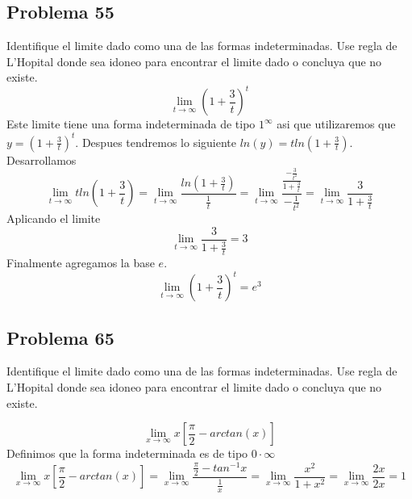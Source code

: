\documentclass{article}
\begin{document}
\subsection{Problema 55}
Identifique el limite dado como una de las formas indeterminadas. Use regla de L'Hopital donde sea idoneo para encontrar el limite dado o concluya que no existe.
\setcounter{equation}{0}
\begin{equation}
    \lim_{t\to \infty}\left(1+\frac{3}{t}\right)^t
\end{equation}
Este limite tiene una forma indeterminada de tipo $1^\infty$ asi que utilizaremos que $y=\left(1+\frac{3}{t}\right)^t$. Despues tendremos lo siguiente $ln(y) =tln\left(1+\frac{3}{t}\right) $.
\newline
Desarrollamos
\begin{equation}
    \lim_{t\to \infty}tln\left(1+\frac{3}{t}\right) = \lim_{t\to \infty}\frac{ln\left(1+\frac{3}{t}\right)}{\frac{1}{t}}=\lim_{t\to \infty}\frac{\frac{-\frac{3}{t^2}}{1+\frac{3}{t}}}{-\frac{1}{t^2}} = \lim_{t\to \infty} \frac{3}{1+\frac{3}{t}}
\end{equation}
Aplicando el limite
\begin{equation}
    \lim_{t\to \infty} \frac{3}{1+\frac{3}{t}} = 3
\end{equation}
Finalmente agregamos la base $e$.
\begin{equation}
    \lim_{t\to \infty}\left(1+\frac{3}{t}\right)^t = e^3
\end{equation}

\subsection{Problema 65}
Identifique el limite dado como una de las formas indeterminadas. Use regla de L'Hopital donde sea idoneo para encontrar el limite dado o concluya que no existe.
\setcounter{equation}{0}

\begin{equation}
    \lim_{x\to \infty} x\left[\frac{\pi}{2}-arctan(x)\right]
\end{equation}
Definimos que la forma indeterminada es de tipo $0\cdot \infty$
\begin{equation}
    \lim_{x\to \infty} x\left[\frac{\pi}{2}-arctan(x)\right] = \lim_{x\to \infty}\frac{\frac{\pi}{2}-tan^{-1}x}{\frac{1}{x}} = \lim_{x\to \infty}\frac{x^2}{1+x^2}=\lim_{x\to \infty}\frac{2x}{2x}=1
\end{equation}
\end{document}
